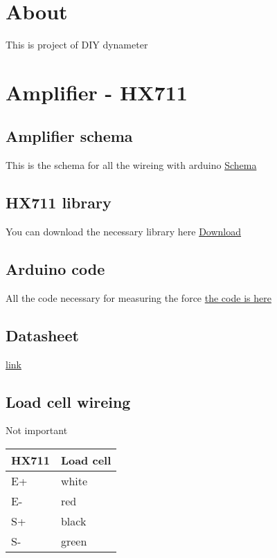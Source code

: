 \documentclass[11pt]{article}
\author{Jacob}
\date{\today}
\title{}
\begin{document}
\tableofcontents

\section{About}
\label{sec:orgd1539f2}
This is project of DIY dynameter
\section{Amplifier - HX711}
\label{sec:org4153932}
\subsection{Amplifier schema}
\label{sec:org9eb0a06}
This is the schema for all the wireing with arduino
 \href{amplifier\_schema.png}{Schema}
\subsection{HX711 library}
\label{sec:org4babe4f}
You can download the necessary library here
\href{https://halckemy.s3.amazonaws.com/uploads/attachments/392655/HX711-master.zip}{Download}
\subsection{Arduino code}
\label{sec:org9f628ee}
All the code necessary for measuring the force
\href{measurement.ino}{the code is here}
\subsection{Datasheet}
\label{sec:org02fad90}
\href{https://circuits4you.com/wp-content/uploads/2016/11/hx711\_datasheet\_english.pdf}{link}
\subsection{Load cell wireing}
\label{sec:orgbceb45d}
Not important
\begin{center}
\begin{tabular}{ll}
HX711 & Load cell\\
\hline
E+ & white\\
E- & red\\
S+ & black\\
S- & green\\
\end{tabular}
\end{center}
\end{document}
